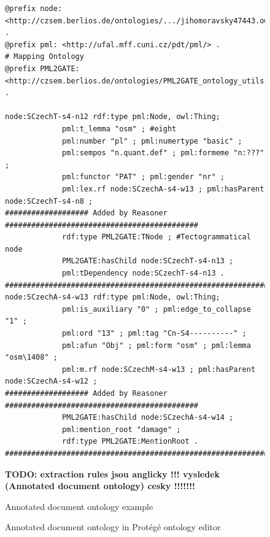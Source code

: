 \begin{figure}
\begin{verbatim}
@prefix node: <http://czsem.berlios.de/ontologies/.../jihomoravsky47443.owl#node/> .
@prefix pml: <http://ufal.mff.cuni.cz/pdt/pml/> .
# Mapping Ontology
@prefix PML2GATE: <http://czsem.berlios.de/ontologies/PML2GATE_ontology_utils.owl#> .

node:SCzechT-s4-n12 rdf:type pml:Node, owl:Thing;
			 pml:t_lemma "osm" ; #eight
			 pml:number "pl" ; pml:numertype "basic" ;
			 pml:sempos "n.quant.def" ; pml:formeme "n:???" ;
			 pml:functor "PAT" ; pml:gender "nr" ;
			 pml:lex.rf node:SCzechA-s4-w13 ; pml:hasParent node:SCzechT-s4-n8 ;
################### Added by Reasoner ############################################
			 rdf:type PML2GATE:TNode ; #Tectogrammatical node
			 PML2GATE:hasChild node:SCzechT-s4-n13 ;
			 pml:tDependency node:SCzechT-s4-n13 .
##################################################################################
node:SCzechA-s4-w13 rdf:type pml:Node, owl:Thing;
			 pml:is_auxiliary "0" ; pml:edge_to_collapse "1" ;
			 pml:ord "13" ; pml:tag "Cn-S4----------" ;
			 pml:afun "Obj" ; pml:form "osm" ; pml:lemma "osm\1408" ;
			 pml:m.rf node:SCzechM-s4-w13 ; pml:hasParent node:SCzechA-s4-w12 ;
################### Added by Reasoner ############################################
			 PML2GATE:hasChild node:SCzechA-s4-w14 ;
			 pml:mention_root "damage" ;
			 rdf:type PML2GATE:MentionRoot .
##################################################################################
\end{verbatim}
\textbf{TODO: extraction rules jsou anglicky !!! vysledek (Annotated document ontology) cesky !!!!!!!}
\caption{Annotated document ontology example}
\label{lst:annotated_DO}
\end{figure}

\begin{figure}
\centerline{}
\caption{Annotated document ontology in Protégé ontology editor}
\label{img:PDT_PROTEGE}
\end{figure}


